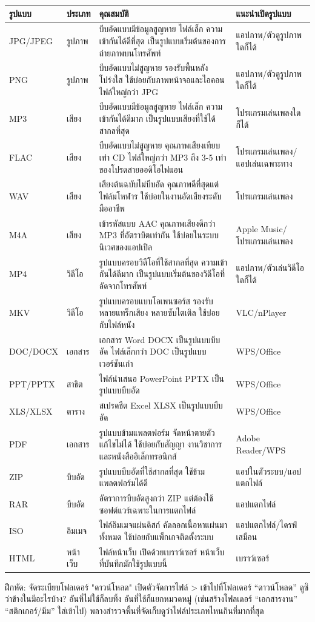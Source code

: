 \begin{center}
\begin{tabularx}{\linewidth}{|X|X|X|X|}
\hline
\textbf{รูปแบบ} & \textbf{ประเภท} & \textbf{คุณสมบัติ} & \textbf{แนะนำเปิดรูปแบบ} \tabularnewline
\hline
JPG/JPEG & รูปภาพ & บีบอัดแบบมีข้อมูลสูญหาย ไฟล์เล็ก ความเข้ากันได้ดีที่สุด เป็นรูปแบบเริ่มต้นของการถ่ายภาพบนโทรศัพท์ & แอปภาพ/ตัวดูรูปภาพใดก็ได้ \tabularnewline
PNG & รูปภาพ & บีบอัดแบบไม่สูญหาย รองรับพื้นหลังโปร่งใส ใช้บ่อยกับภาพหน้าจอและไอคอน ไฟล์ใหญ่กว่า JPG & แอปภาพ/ตัวดูรูปภาพใดก็ได้ \tabularnewline
MP3 & เสียง & บีบอัดแบบมีข้อมูลสูญหาย ไฟล์เล็ก ความเข้ากันได้ดีมาก เป็นรูปแบบเสียงที่ใช้ได้สากลที่สุด & โปรแกรมเล่นเพลงใดก็ได้ \tabularnewline
FLAC & เสียง & บีบอัดแบบไม่สูญหาย คุณภาพเสียงเทียบเท่า CD ไฟล์ใหญ่กว่า MP3 ถึง 3-5 เท่า ของโปรดสายออดิโอไฟแอน & โปรแกรมเล่นเพลง/แอปเล่นเฉพาะทาง \tabularnewline
WAV & เสียง & เสียงต้นฉบับไม่บีบอัด คุณภาพดีที่สุดแต่ไฟล์มโหฬาร ใช้บ่อยในงานอัดเสียงระดับมืออาชีพ & โปรแกรมเล่นเพลง \tabularnewline
M4A & เสียง & เข้ารหัสแบบ AAC คุณภาพเสียงดีกว่า MP3 ที่อัตราบิตเท่ากัน ใช้บ่อยในระบบนิเวศของแอปเปิล & Apple Music/โปรแกรมเล่นเพลง \tabularnewline
MP4 & วิดีโอ & รูปแบบครอบวิดีโอที่ใช้สากลที่สุด ความเข้ากันได้ดีมาก เป็นรูปแบบเริ่มต้นของวิดีโอที่อัดจากโทรศัพท์ & แอปภาพ/ตัวเล่นวิดีโอใดก็ได้ \tabularnewline
MKV & วิดีโอ & รูปแบบครอบแบบโอเพนซอร์ส รองรับหลายแทร็กเสียง หลายซับไตเติล ใช้บ่อยกับไฟล์หนัง & VLC/nPlayer \tabularnewline
DOC/DOCX & เอกสาร & เอกสาร Word DOCX เป็นรูปแบบบีบอัด ไฟล์เล็กกว่า DOC เป็นรูปแบบเวอร์ชันเก่า & WPS/Office \tabularnewline
PPT/PPTX & สาธิต & ไฟล์นำเสนอ PowerPoint PPTX เป็นรูปแบบบีบอัด & WPS/Office \tabularnewline
XLS/XLSX & ตาราง & สเปรดชีต Excel XLSX เป็นรูปแบบบีบอัด & WPS/Office \tabularnewline
PDF & เอกสาร & รูปแบบข้ามแพลตฟอร์ม จัดหน้าตายตัวแก้ไขไม่ได้ ใช้บ่อยกับสัญญา งานวิชาการ และหนังสืออิเล็กทรอนิกส์ & Adobe Reader/WPS \tabularnewline
ZIP & บีบอัด & รูปแบบบีบอัดที่ใช้สากลที่สุด ใช้ข้ามแพลตฟอร์มได้ดี & แอปในตัวระบบ/แอปแตกไฟล์ \tabularnewline
RAR & บีบอัด & อัตราการบีบอัดสูงกว่า ZIP แต่ต้องใช้ซอฟต์แวร์เฉพาะในการแตกไฟล์ & แอปแตกไฟล์ \tabularnewline
ISO & อิมเมจ & ไฟล์อิมเมจแผ่นดิสก์ คัดลอกเนื้อหาแผ่นมาทั้งหมด ใช้บ่อยกับแพ็กเกจติดตั้งระบบ & แอปแตกไฟล์/ไดรฟ์เสมือน \tabularnewline
HTML & หน้าเว็บ & ไฟล์หน้าเว็บ เปิดด้วยเบราว์เซอร์ หน้าเว็บที่บันทึกมักใช้รูปแบบนี้ & เบราว์เซอร์ \tabularnewline
\hline
\end{tabularx}
\end{center}

\begin{tcbpractice}{ฝึกหัด: จัดระเบียบโฟลเดอร์ "ดาวน์โหลด"}
เปิดตัวจัดการไฟล์ > เข้าไปที่โฟลเดอร์ “ดาวน์โหลด” ดูซิว่าข้างในมีอะไรบ้าง? อันที่ไม่ใช้ก็ลบทิ้ง อันที่ใช้ก็แยกหมวดหมู่ (เช่นสร้างโฟลเดอร์ “เอกสารงาน” “สติกเกอร์/มีม” ใส่เข้าไป) พลางสำรวจพื้นที่จัดเก็บดูว่าไฟล์ประเภทไหนกินที่มากที่สุด

\end{tcbpractice}

